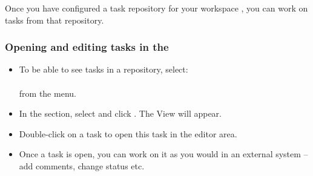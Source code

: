 Once you have configured a task repository for your workspace , you can work on tasks from that repository. 

\subsubsection{Opening and editing tasks in the \ite{}}
\begin{itemize}
\item To be able to see tasks in a repository, select: \\ \\ from the menu. 
\item In the  section, select  and click . The  View will appear.
\item Double-click on a task to open this task in the editor area.
\item Once a task is open, you can work on it as you would in an external system -- add comments, change status etc.
\end{itemize}

